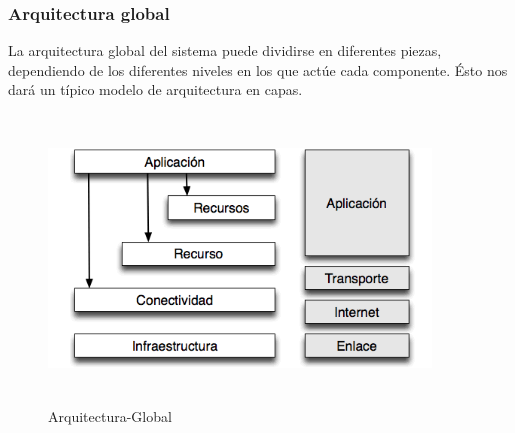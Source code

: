 \subsubsection{Arquitectura global}

La arquitectura global del sistema puede dividirse en diferentes piezas, dependiendo de los diferentes niveles en los que actúe cada componente. Ésto nos dará un típico modelo de arquitectura en capas.

\begin{figure}[H]
\begin{center}
  \includegraphics[height=3.0in,width=4.0in]{images/arquitectura-grid.png}
\caption{Arquitectura-Global}
\label{fig:Arquitectura}
\end{center}
\end{figure}

